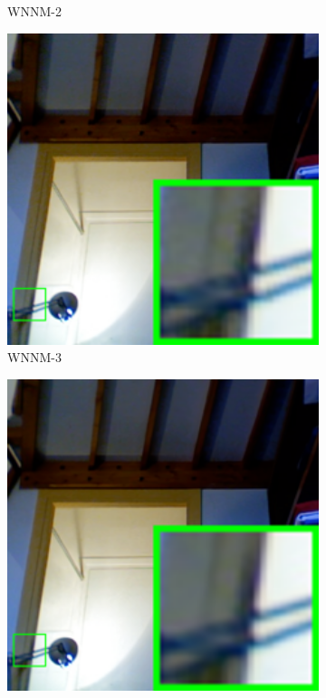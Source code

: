 \begin{figure}
\begin{subfigure}[t]{0.19\textwidth}
		\caption{WNNM-2}
    \end{subfigure}
    \hfill
    \begin{subfigure}[t]{0.19\textwidth}
        \centering
        \includegraphics[width=1\textwidth]{images/mcwnnm/nc/resize_br_WNNM_ADMM_room.png}
		\caption{WNNM-3}
    \end{subfigure}
    \hfill
    \begin{subfigure}[t]{0.19\textwidth}
        \centering
        \includegraphics[width=1\textwidth]{images/mcwnnm/nc/resize_br_CWNNM_ADMM_NL_room.png}

\end{subfigure}
\end{figure}
